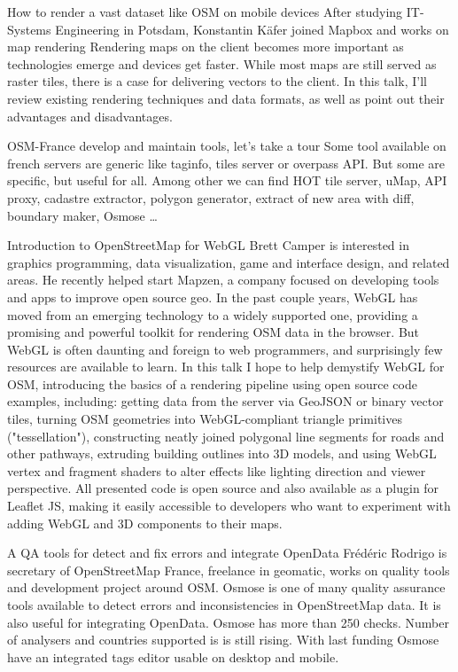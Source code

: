%
{How to render a vast dataset like OSM on mobile devices}%
{After studying IT-Systems Engineering in Potsdam, Konstantin Käfer joined Mapbox and works on map rendering}%
{Rendering maps on the client becomes more important as technologies emerge and devices get faster. While most maps are still served as raster tiles, there is a case for delivering vectors to the client. In this talk, I'll review existing rendering techniques and data formats, as well as point out their advantages and disadvantages.}

%
{OSM-France develop and maintain tools, let's take a tour}%
{}%
{Some tool available on french servers are generic like taginfo, tiles server or overpass API. But some are specific, but useful for all. Among other we can find HOT tile server, uMap, API proxy, cadastre extractor, polygon generator, extract of new area with diff, boundary maker, Osmose \dots}



%
{Introduction to OpenStreetMap for WebGL}%
{Brett Camper is interested in graphics programming, data visualization, game and interface design, and related areas. He recently helped start Mapzen, a company focused on developing tools and apps to improve open source geo.}%
{In the past couple years, WebGL has moved from an emerging technology to a widely supported one, providing a promising and powerful toolkit for rendering OSM data in the browser. But WebGL is often daunting and foreign to web programmers, and surprisingly few resources are available to learn. In this talk I hope to help demystify WebGL for OSM, introducing the basics of a rendering pipeline using open source code examples, including: getting data from the server via GeoJSON or binary vector tiles, turning OSM geometries into WebGL-compliant triangle primitives ("tessellation"), constructing neatly joined polygonal line segments for roads and other pathways, extruding building outlines into 3D models, and using WebGL vertex and fragment shaders to alter effects like lighting direction and viewer perspective. All presented code is open source and also available as a plugin for Leaflet JS, making it easily accessible to developers who want to experiment with adding WebGL and 3D components to their maps.}


%
{A QA tools for detect and fix errors and integrate OpenData}%
{Frédéric Rodrigo is secretary of OpenStreetMap France, freelance in geomatic, works on quality tools and development project around OSM.}%
{Osmose is one of many quality assurance tools available to detect errors and inconsistencies in OpenStreetMap data. It is also useful for integrating OpenData. Osmose has more than 250 checks. Number of analysers and countries supported is is still rising. With last funding Osmose have an integrated tags editor usable on desktop and mobile.}

